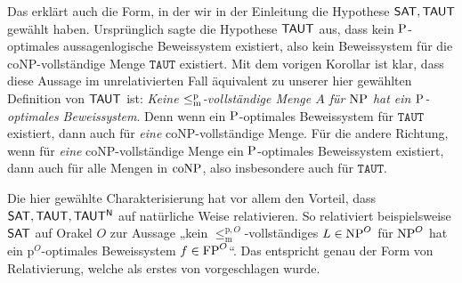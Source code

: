 Das erklärt auch die Form, in der wir in der Einleitung die Hypothese $\hSAT, \hTAUT$ gewählt haben.
Ursprünglich sagte die Hypothese $\hTAUT$ aus, dass kein $\P$-optimales aussagenlogische Beweissystem existiert, also kein Beweissystem für die coNP-vollständige Menge $\mathtt{TAUT}$ existiert.
Mit dem vorigen Korollar ist klar, dass diese Aussage im unrelativierten Fall äquivalent zu unserer hier gewählten Definition von $\hTAUT$ ist: \emph{Keine $\leqmp$-vollständige Menge $A$ für $\NP$ hat ein $\P$-optimales Beweissystem}.
Denn wenn ein $\P$-optimales Beweissystem für $\mathtt{TAUT}$ existiert, dann auch für \emph{eine} coNP-vollständige Menge.
Für die andere Richtung, wenn für \emph{eine} coNP-vollständige Menge ein $\P$-optimales Beweissystem existiert, dann auch für alle Mengen in $\coNP$, also insbesondere auch für $\mathtt{TAUT}$.

Die hier gewählte Charakterisierung hat vor allem den Vorteil, dass $\hSAT, \hTAUT, \mathsf{TAUT^N}$ auf natürliche Weise relativieren.
So relativiert beispielsweise $\hSAT$ auf Orakel $O$ zur Aussage „kein $\leq_\mathrm{m}^{\mathrm p,O}$-vollständiges $L\in\NP^O$ für $\NP^O$ hat ein p${}^O$-optimales Beweissystem $f\in\FP^O$“.
Das entspricht genau der Form von Relativierung, welche als erstes von \textcite{dose_oracle_2020} vorgeschlagen wurde.




